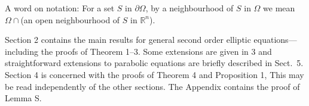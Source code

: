 A word on notation: For a set $S$ in $\partial\Omega$, by a neighbourhood of $S$ in $\Omega$
we mean $\Omega\cap$(an open neighbourhood of $S$ in $\mathbb{R}^n$).

Section 2 contains the main results for general second order elliptic equations---including 
the proofs of Theorem 1--3. Some extensions are given in 3 and straightforward extensions to 
parabolic equations are briefly described in Sect.~5. Section 4 is concerned with 
the proofs of Theorem 4 and Proposition 1, This may be read independently of the other sections.
The Appendix contains the proof of Lemma S.